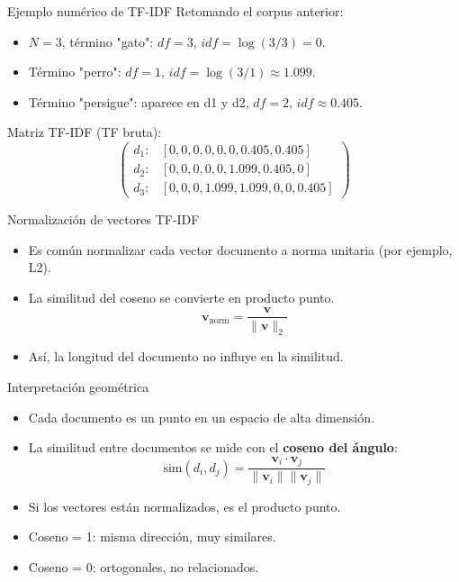 \documentclass[aspectratio=169, 10pt, xcolor=table]{beamer}
\begin{document}
\begin{frame}{Ejemplo numérico de TF-IDF}
    Retomando el corpus anterior:
    \begin{itemize}
        \item $N=3$, término "gato": $df=3$, $idf = \log(3/3)=0$.
        \item Término "perro": $df=1$, $idf = \log(3/1) \approx 1.099$.
        \item Término "persigue": aparece en d1 y d2, $df=2$, $idf \approx 0.405$.
    \end{itemize}
    Matriz TF-IDF (TF bruta):
    \[
    \begin{pmatrix}
    d_1: & [0,0,0,0,0,0,0.405,0.405] \\
    d_2: & [0,0,0,0,0,1.099,0.405,0] \\
    d_3: & [0,0,0,1.099,1.099,0,0,0.405]
    \end{pmatrix}
    \]
\end{frame}

\begin{frame}{Normalización de vectores TF-IDF}
    \begin{itemize}
        \item Es común normalizar cada vector documento a norma unitaria (por ejemplo, L2).
        \item La similitud del coseno se convierte en producto punto.
        \[
        \mathbf{v}_{\text{norm}} = \frac{\mathbf{v}}{\|\mathbf{v}\|_2}
        \]
        \item Así, la longitud del documento no influye en la similitud.
    \end{itemize}
\end{frame}

\begin{frame}{Interpretación geométrica}
    \begin{itemize}
        \item Cada documento es un punto en un espacio de alta dimensión.
        \item La similitud entre documentos se mide con el \textbf{coseno del ángulo}:
        \[
        \text{sim}(d_i, d_j) = \frac{\mathbf{v}_i \cdot \mathbf{v}_j}{\|\mathbf{v}_i\| \|\mathbf{v}_j\|}
        \]
        \item Si los vectores están normalizados, es el producto punto.
        \item Coseno = 1: misma dirección, muy similares.
        \item Coseno = 0: ortogonales, no relacionados.
    \end{itemize}
\end{frame}
\end{document}
